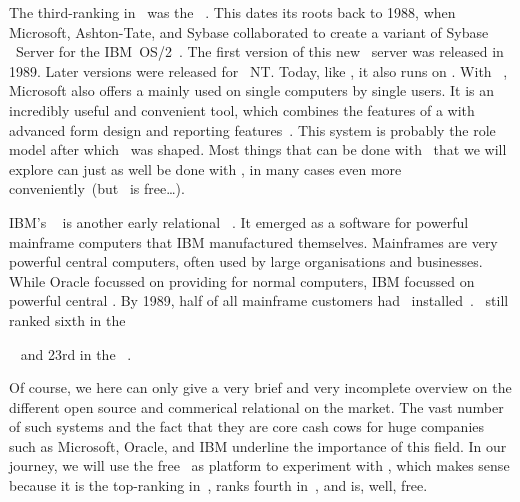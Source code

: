 The third-ranking  in~\cite{RS2025DERORD} was the \microsoftSqlServer~\cite{P2020MSS2ABG,A2024TSAFMSS2,W2018MSSDB}.
This  dates its roots back to 1988, when Microsoft, Ashton-Tate, and Sybase collaborated to create a variant of Sybase \sql\ Server for the  IBM~OS/2~\cite{W2018MSSDB:TEOMSS}.
The first version of this new \db\ server was released in 1989.
Later versions were released for \microsoftWindows~NT.
Today, like \oracleDB, it also runs on \linux.
With \microsoftAccess~\cite{LF2022MOSBSO2AM3}, Microsoft also offers a  mainly used on single computers by single users.
It is an incredibly useful and convenient tool, which combines the features of a  with advanced form design and reporting features~\cite{SSI2023MA2BTA,B2020HOMA2,UC2021AFD,MM2014RDAMA}.
This system is probably the role model after which \libreofficeBase\ was shaped.
Most things that can be done with \libreofficeBase\ that we will explore can just as well be done with \microsoftAccess, in many cases even more conveniently~(but \libreofficeBase\ is free\dots).

IBM's \ibmDB~\cite{CWDS2007UDLVWE,BBBCCDMMP2016SPTAFOIDFI} is another early relational \dbms~\cite{HS2013THAGOID}.
It emerged as a software for powerful mainframe computers that IBM manufactured themselves.
Mainframes are very powerful central computers, often used by large organisations and businesses.
While Oracle focussed on providing  for normal computers, IBM focussed on powerful central .
By 1989, half of all mainframe customers had \ibmDB\ installed~\cite{HS2013THAGOID}.
\ibmDB\ still ranked sixth in the~\begin{noglslink}\end{noglslink}~\cite{RS2025DERORD} and 23rd in the ~\cite{SE:SO:2024DS}.%
%
\endhsection%

Of course, we here can only give a very brief and very incomplete overview on the different open source and commerical relational  on the market.
The vast number of such systems and the fact that they are core cash cows for huge companies such as Microsoft, Oracle, and IBM underline the importance of this field.
In our journey, we will use the free \postgresql\ as platform to experiment with , which makes sense because it is the top-ranking  in~\cite{SE:SO:2024DS}, ranks fourth in~\cite{RS2025DERORD}, and is, well, free.%
%
\endhsection%
%
